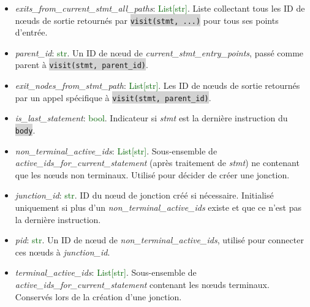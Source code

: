\documentclass[11pt,a4paper]{article}
\newcommand{\code}[1]{\colorbox{lightgray}{\texttt{\small #1}}}
\newcommand{\var}[1]{\textit{#1}}
\newcommand{\vartype}[1]{\textcolor{darkgreen}{#1}}
\newcommand{\param}[1]{\code{#1}}
\begin{document}
\begin{description}
\begin{itemize}
        \item \var{exits\_from\_current\_stmt\_all\_paths}: \vartype{List[str]}. Liste collectant tous les ID de nœuds de sortie retournés par \code{visit(stmt, ...)} pour tous ses points d'entrée.
        \item \var{parent\_id}: \vartype{str}. Un ID de nœud de \var{current\_stmt\_entry\_points}, passé comme parent à \code{visit(stmt, parent\_id)}.
        \item \var{exit\_nodes\_from\_stmt\_path}: \vartype{List[str]}. Les ID de nœuds de sortie retournés par un appel spécifique à \code{visit(stmt, parent\_id)}.
        \item \var{is\_last\_statement}: \vartype{bool}. Indicateur si \var{stmt} est la dernière instruction du \param{body}.
        \item \var{non\_terminal\_active\_ids}: \vartype{List[str]}. Sous-ensemble de \var{active\_ids\_for\_current\_statement} (après traitement de \var{stmt}) ne contenant que les nœuds non terminaux. Utilisé pour décider de créer une jonction.
        \item \var{junction\_id}: \vartype{str}. ID du nœud de jonction créé si nécessaire. Initialisé uniquement si plus d'un \var{non\_terminal\_active\_ids} existe et que ce n'est pas la dernière instruction.
        \item \var{pid}: \vartype{str}. Un ID de nœud de \var{non\_terminal\_active\_ids}, utilisé pour connecter ces nœuds à \var{junction\_id}.
        \item \var{terminal\_active\_ids}: \vartype{List[str]}. Sous-ensemble de \var{active\_ids\_for\_current\_statement} contenant les nœuds terminaux. Conservés lors de la création d'une jonction.
    \end{itemize}
\end{description}
\end{document}
